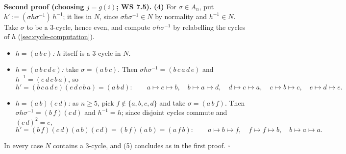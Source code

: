 \documentclass[11pt]{report}
\renewenvironment{proof}[1][Proof]{\noindent\textbf{#1.} }{\hfill$\square$\par\vspace{5pt}}
\begin{document}
\begin{proof}[Second proof (choosing $j = g(i)$; WS 7.5)]
\textbf{(4)} For $\sigma \in A_n$, put $h' := (\sigma h \sigma^{-1})\,h^{-1}$; it lies in $N$, since $\sigma h \sigma^{-1} \in N$ by normality and $h^{-1} \in N$. Take $\sigma$ to be a $3$-cycle, hence even, and compute $\sigma h \sigma^{-1}$ by relabelling the cycles of $h$ (\ref{sec:cycle-computation}).
\begin{itemize}
    \item \emph{$h = (a\,b\,c)$:} $h$ itself is a $3$-cycle in $N$.
    \item \emph{$h = (a\,b\,c\,d\,e)$:} take $\sigma = (a\,b\,c)$. Then $\sigma h \sigma^{-1} = (b\,c\,a\,d\,e)$ and $h^{-1} = (e\,d\,c\,b\,a)$, so
    \[ h' = (b\,c\,a\,d\,e)(e\,d\,c\,b\,a) = (a\,b\,d): \qquad a \mapsto e \mapsto b,\quad b \mapsto a \mapsto d,\quad d \mapsto c \mapsto a,\quad c \mapsto b \mapsto c,\quad e \mapsto d \mapsto e. \]
    \item \emph{$h = (a\,b)(c\,d)$:} as $n \geq 5$, pick $f \notin \{a, b, c, d\}$ and take $\sigma = (a\,b\,f)$. Then $\sigma h \sigma^{-1} = (b\,f)(c\,d)$ and $h^{-1} = h$; since disjoint cycles commute and $(c\,d)^2 = e$,
    \[ h' = (b\,f)(c\,d)(a\,b)(c\,d) = (b\,f)(a\,b) = (a\,f\,b): \qquad a \mapsto b \mapsto f,\quad f \mapsto f \mapsto b,\quad b \mapsto a \mapsto a. \]
\end{itemize}
In every case $N$ contains a $3$-cycle, and (5) concludes as in the first proof.
\end{proof}
\end{document}
